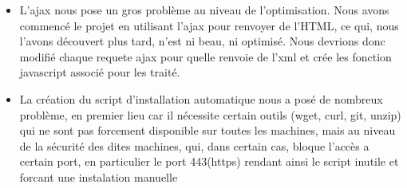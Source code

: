 \documentclass[a4paper,10pt]{report}
\begin{document}
\begin{itemize}
    \null
    
    \item L'ajax nous pose un gros probl\`eme au niveau de l'optimisation. Nous avons
    commenc\'e le projet en utilisant l'ajax pour renvoyer de l'HTML, ce qui, nous l'avons
    d\'ecouvert plus tard, n'est ni beau, ni optimis\'e. Nous devrions donc modifi\'e
    chaque requete ajax pour quelle renvoie de l'xml et cr\'ee les fonction javascript
    associ\'e pour les trait\'e.

    \null
    
    \item La cr\'eation du script d'installation automatique nous a pos\'e de nombreux
    probl\`eme, en premier lieu car il n\'ecessite certain outils (wget, curl, git, unzip)
    qui ne sont pas forcement disponible sur toutes les machines, mais au niveau de la
    s\'ecurit\'e des dites machines, qui, dans certain cas, bloque l'accès a certain port, en
    particulier le port 443(https) rendant ainsi le script inutile et forcant une instalation
    manuelle
\end{itemize}
\end{document}
